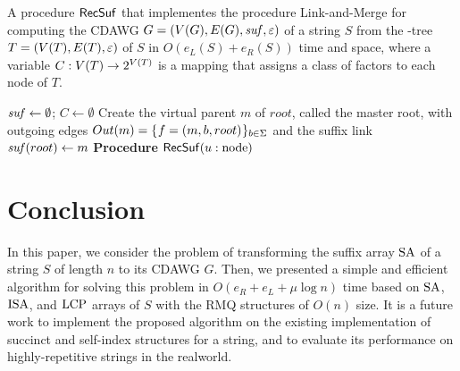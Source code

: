 \begin{algorithm}[t]
  \caption{A procedure $\mathsf{RecSuf}$ that implementes the procedure Link-and-Merge for computing the CDAWG $G = (V(G), E(G), \mathit{suf}, \varepsilon)$ of a string $S$  from the \LPTrm-tree $T = (V(T), E(T), \varepsilon)$ of $S$ in $O(e_L(S) + e_R(S))$ time and space, where a variable $C: V(T)\to 2^{V(T)}$ is a mapping that assigns a class of factors to each node of $T$. 
  }\label{algo:rec:cdawg}
  $\mathit{suf} \gets \emptyset$; 
  $C \gets \emptyset$\;
  Create the virtual parent $m$ of $root$, called the master root,  with outgoing edges $Out(m) = \{\kern0.05em f = (m, b, root) \kern0.05em\}_{b \in \Sigma}$ and the suffix link $\mathit{suf}(root) \gets m$\;
  \medskip
  \textbf{Procedure} $\mathsf{RecSuf}(u: \mathrm{node})$\; 
\end{algorithm}


\section{Conclusion}
\label{sec:concl}
In this paper, we consider the problem of transforming the suffix array $\mathrm{SA}$ of a string $S$ of length $n$ to its CDAWG $G$. Then, we  presented a simple and efficient algorithm for solving this problem in $O(e_R + e_L + \mu\log n)$ time  based on $\mathrm{SA}$, $\mathrm{ISA}$, and $\mathrm{LCP}$ arrays of $S$ with the RMQ structures of $O(n)$ size.
It is a future work to implement the proposed algorithm on the existing implementation of succinct and self-index structures for a string, and to evaluate its performance on highly-repetitive strings in the realworld. 


